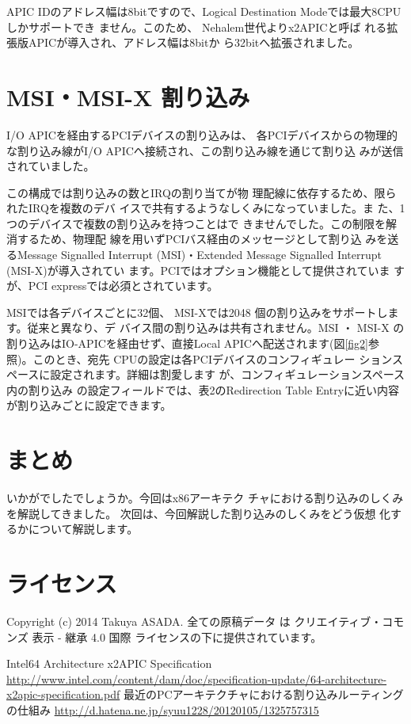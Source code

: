  APIC IDのアドレス幅は8bitですので、Logical
Destination Modeでは最大8CPUしかサポートでき
ません。このため、 Nehalem世代よりx2APICと呼ば
れる拡張版APICが導入され、アドレス幅は8bitか
ら32bitへ拡張されました\cite{x2APIC}。

\section{MSI・MSI-X 割り込み}

 I/O APICを経由するPCIデバイスの割り込みは、
各PCIデバイスからの物理的な割り込み線がI/O
APICへ接続され、この割り込み線を通じて割り込
みが送信されていました。

 この構成では割り込みの数とIRQの割り当てが物
理配線に依存するため、限られたIRQを複数のデバ
イスで共有するようなしくみになっていました。ま
た、1つのデバイスで複数の割り込みを持つことはで
きませんでした。この制限を解消するため、物理配
線を用いずPCIバス経由のメッセージとして割り込
みを送るMessage Signalled Interrupt (MSI)・Extended
Message Signalled Interrupt (MSI-X)が導入されてい
ます。PCIではオプション機能として提供されていま
すが、PCI expressでは必須とされています。

 MSIでは各デバイスごとに32個、 MSI-Xでは2048
個の割り込みをサポートします。従来と異なり、デ
バイス間の割り込みは共有されません。MSI ・ MSI-X
の割り込みはIO-APICを経由せず、直接Local
APICへ配送されます(図\ref{fig2}参照)。このとき、宛先
CPUの設定は各PCIデバイスのコンフィギュレー
ションスペースに設定されます。詳細は割愛します
が、コンフィギュレーションスペース内の割り込み
の設定フィールドでは、表2のRedirection Table
Entryに近い内容が割り込みごとに設定できます\cite{interrupt-routing}。

\section{まとめ}

 いかがでしたでしょうか。今回はx86アーキテク
チャにおける割り込みのしくみを解説してきました。
次回は、今回解説した割り込みのしくみをどう仮想
化するかについて解説します。

\section{ライセンス}
Copyright (c) 2014 Takuya ASADA.
全ての原稿データ は クリエイティブ・コモンズ 表示 - 継承 4.0 国際 ライセンスの下に提供されています。

\begin{thebibliography}{4}
   Intel64 Architecture x2APIC Specification \url{http://www.intel.com/content/dam/doc/specification-update/64-architecture-x2apic-specification.pdf}
   最近のPCアーキテクチャにおける割り込みルーティングの仕組み \url{http://d.hatena.ne.jp/syuu1228/20120105/1325757315}
\end{thebibliography}




